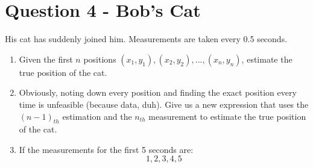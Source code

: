 \documentclass[a4paper, 12pt]{exam}
\begin{document}
	
	\pagebreak
	\section*{Question 4 - Bob's Cat}
	His cat has suddenly joined him. Measurements are taken every 0.5 seconds.
	\begin{enumerate}[label = (\alph*)]
		\item Given the first $n$ positions ${(x_1, y_1), (x_2, y_2), ... , (x_n, y_n)}$, estimate the true position of the cat.
		\item Obviously, noting down every position and finding the exact position every time is unfeasible (because data, duh). Give us a new expression that uses the $(n-1)_{th}$ estimation and the $n_{th}$ measurement to estimate the true position of the cat.
		\item If the measurements for the first 5 seconds are:
		\begin{equation*}
			1,2,3,4,5
		\end{equation*}
	\end{enumerate}
	
	
\end{document}
